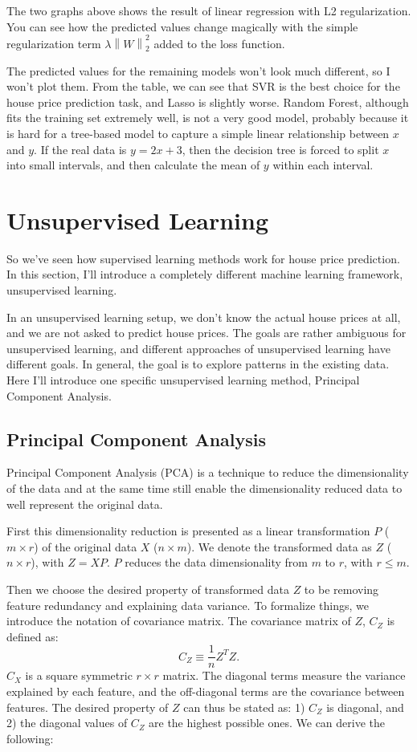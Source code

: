 \documentclass[a4paper]{article}
\newcommand{\norm}[1]{\left\lVert#1\right\rVert}
\begin{document}
The two graphs above shows the result of linear regression with L2 regularization. You can see how the predicted values change magically with the simple regularization term $\lambda \norm{W}_2^2$ added to the loss function. 

The predicted values for the remaining models won't look much different, so I won't plot them. From the table, we can see that SVR is the best choice for the house price prediction task, and Lasso is slightly worse. Random Forest, although fits the training set extremely well, is not a very good model, probably because it is hard for a tree-based model to capture a simple linear relationship between $x$ and $y$. If the real data is $y=2x+3$, then the decision tree is forced to split $x$ into small intervals, and then calculate the mean of $y$ within each interval.

\section{Unsupervised Learning}
So we've seen how supervised learning methods work for house price prediction. In this section, I'll introduce a completely different machine learning framework, unsupervised learning. 

In an unsupervised learning setup, we don't know the actual house prices at all, and we are not asked to predict house prices. The goals are rather ambiguous for unsupervised learning, and different approaches of unsupervised learning have different goals. In general, the goal is to explore patterns in the existing data. Here I'll introduce one specific unsupervised learning method, Principal Component Analysis.

\subsection{Principal Component Analysis}

Principal Component Analysis (PCA) \citep{shlens2014tutorial} is a technique to reduce the dimensionality of the data and at the same time still enable the dimensionality reduced data to well represent the original data. 

First this dimensionality reduction is presented as a linear transformation $P$ ($m\times r$) of the original data $X$ ($n\times m$). We denote the transformed data as $Z$ ($n\times r$), with $Z = XP$. $P$ reduces the data dimensionality from $m$ to $r$, with $r \leq m$. 

Then we choose the desired property of transformed data $Z$ to be removing feature redundancy and explaining data variance. To formalize things, we introduce the notation of covariance matrix. The covariance matrix of $Z$, $C_Z$ is defined as:
\begin{equation}
  C_Z \equiv \frac{1}{n} Z^T Z.
\end{equation}
$C_X$ is a square symmetric $r\times r$ matrix. The diagonal terms measure the variance explained by each feature, and the off-diagonal terms are the covariance between features. The desired property of $Z$ can thus be stated as: 1) $C_Z$ is diagonal, and 2) the diagonal values of $C_Z$ are the highest possible ones. We can derive the following:
\end{document}
